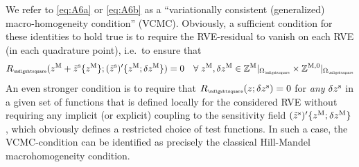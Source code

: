 \documentclass[12pt,a4paper]{article}
\renewcommand{\Box}{\mdlgwhtsquare}
\newcommand{\rve}{
  {\mathchoice
   {\mbox{\scalebox{0.67}{$\Box$}}}
   {\mbox{\scalebox{0.67}{$\Box$}}}
   {\mbox{\scalebox{0.5}{$\Box$}}}
   {\mbox{\scalebox{0.375}{$\Box$}}}
  }
}
\begin{document}
We refer to \eqref{eq:A6a} or \eqref{eq:A6b} as a ``variationally consistent (generalized) macro-homogeneity condition'' (VCMC).
Obviously, a sufficient condition for these identities to hold true is to require the RVE-residual to vanish on each RVE (in each quadrature point), i.e.\ to ensure that
\begin{align}
\label{eq:A8} R_\rve(z^\macro + \tilde z^\fluct\{z^\macro\};(\tilde{z}^\fluct)'\{z^\macro;\delta z^\macro\}) = 0\quad \forall\;z^\macro,\delta z^\macro\in\set Z^{\macro}|_{\Omega_\rve}\times\set Z^{\macro,0}|_{\Omega_\rve}
\end{align}
An even stronger condition is to require that $R_\rve(z;\delta z^\fluct) = 0$ for \emph{any} $\delta z^{\mathrm{s}}$ in a given set of functions that is defined locally for the considered RVE without requiring any implicit (or explicit) 
coupling to the sensitivity field $(\tilde{z}^{\mathrm{s}})'\{z^{\mathrm{M}};\delta z^{\mathrm{M}}\}$, which obviously defines a restricted choice of test functions.
In such a case, the VCMC-condition can be identified as precisely the classical Hill-Mandel macrohomogeneity condition.
\end{document}
